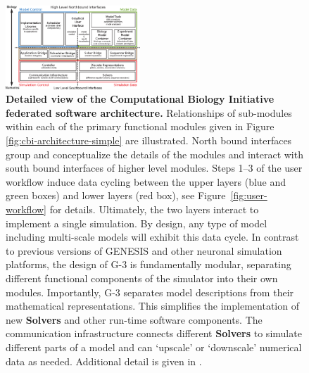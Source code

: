 \documentclass[11pt,3p,twocolumn]{JMN}
\begin{document}
\begin{figure}[h!t]
  \begin{center}
    \includegraphics[width=0.45\textwidth]{figures/cbi-architecture-expanded.eps}
  \end{center}
  \caption{ \small{{\bf Detailed view of the Computational Biology Initiative
      federated software architecture.} Relationships of sub-modules
    within each of the primary functional modules given in Figure
    \ref{fig:cbi-architecture-simple} are illustrated.  North bound interfaces group
    and conceptualize the details of the modules and interact with
    south bound interfaces of higher level modules.  Steps 1--3 of the
    user workflow induce data cycling between the
    upper layers (blue and green boxes) and lower layers (red box), see Figure~\ref{fig:user-workflow} for details.
    Ultimately, the two layers interact to implement a single simulation.
    By design, any type of model including multi-scale models will
    exhibit this data cycle. In contrast to previous versions of GENESIS and
    other neuronal simulation platforms, the design of G-3 is
    fundamentally modular, separating different functional components
    of the simulator into their own modules. Importantly, G-3
    separates model descriptions from their mathematical representations.  This simplifies the
    implementation of new {\bf Solvers} and other run-time software
    components. The communication infrastructure connects different
    {\bf Solvers} to simulate different parts of a model and can `upscale' or `downscale'
    numerical data as needed. Additional detail is given in \cite{cornelis12}.}}
  \label{fig:cbi-architecture-expanded}
\end{figure}

\end{document}
